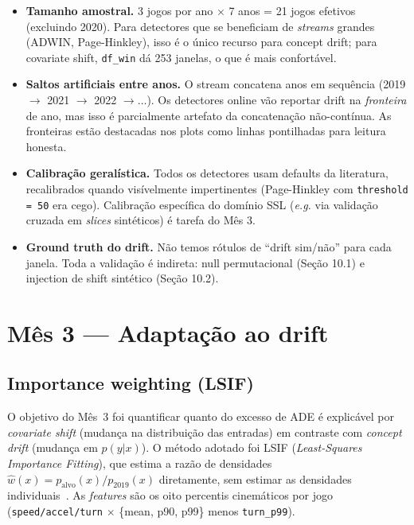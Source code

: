 \documentclass[11pt,a4paper]{article}
\begin{document}
\begin{itemize}[leftmargin=1.4em,itemsep=2pt]
    \item \textbf{Tamanho amostral.} 3 jogos por ano $\times$ 7 anos = 21
          jogos efetivos (excluindo 2020). Para detectores que se beneficiam
          de \emph{streams} grandes (ADWIN, Page-Hinkley), isso \'e o
          \'unico recurso para concept drift; para covariate shift,
          \texttt{df\_win} d\'a 253 janelas, o que \'e mais confort\'avel.
    \item \textbf{Saltos artificiais entre anos.} O stream concatena anos
          em sequ\^encia (2019 $\to$ 2021 $\to$ 2022 $\to \ldots$). Os
          detectores online v\~ao reportar drift na \emph{fronteira} de
          ano, mas isso \'e parcialmente artefato da concatena\c{c}\~ao
          n\~ao-cont\'inua. As fronteiras est\~ao destacadas nos plots
          como linhas pontilhadas para leitura honesta.
    \item \textbf{Calibra\c{c}\~ao geral\'istica.} Todos os detectores
          usam defaults da literatura, recalibrados quando vis\'ivelmente
          impertinentes (Page-Hinkley com \texttt{threshold = 50} era
          cego). Calibra\c{c}\~ao espec\'ifica do dom\'inio SSL (\emph{e.g.}
          via valida\c{c}\~ao cruzada em \emph{slices} sint\'eticos)
          \'e tarefa do M\^es 3.
    \item \textbf{Ground truth do drift.} N\~ao temos r\'otulos de
          ``drift sim/n\~ao'' para cada janela. Toda a valida\c{c}\~ao
          \'e indireta: null permutacional (Se\c{c}\~ao 10.1) e injection
          de shift sint\'etico (Se\c{c}\~ao 10.2).
\end{itemize}

\section{M\^es 3 --- Adapta\c{c}\~ao ao drift}

\subsection{Importance weighting (LSIF)}

O objetivo do M\^es~3 foi quantificar quanto do excesso de ADE \'e
explic\'avel por \emph{covariate shift} (mudan\c{c}a na distribui\c{c}\~ao
das entradas) em contraste com \emph{concept drift} (mudan\c{c}a em
$p(y|x)$). O m\'etodo adotado foi LSIF (\emph{Least-Squares Importance
Fitting}), que estima a raz\~ao de densidades
$\hat{w}(x) = p_{\text{alvo}}(x) / p_{2019}(x)$ diretamente,
sem estimar as densidades individuais~\cite{kliep,sugiyama_book}.
As \emph{features} s\~ao os oito percentis cinem\'aticos por jogo
(\texttt{speed/accel/turn} $\times$ \{mean, p90, p99\} menos
\texttt{turn\_p99}).
\end{document}
